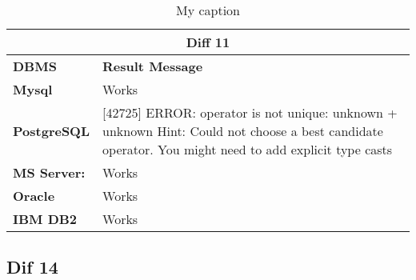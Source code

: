 \begin{table}[h]
\centering
\caption{My caption}
\label{my-label}
\begin{tabular}{|p{2cm}|p{12cm}|}
\hline
\multicolumn{2}{|c|}{\textbf{Diff 11}}                                                                                                                                                                                       \\ \hline
\textbf{DBMS}                              & \textbf{Result Message}                                                                                                                                                         \\ \hline
{\color[HTML]{333333} \textbf{Mysql}}      & {\color[HTML]{333333} Works}                                                                                                                                                    \\ \hline
{\color[HTML]{333333} \textbf{PostgreSQL}} & {\color[HTML]{333333} {[}42725{]} ERROR: operator is not unique: unknown + unknown Hint: Could not choose a best candidate operator. You might need to add explicit type casts} \\ \hline
{\color[HTML]{333333} \textbf{MS Server:}} & {\color[HTML]{333333} Works}                                                                                                                                                    \\ \hline
\textbf{Oracle}                            & Works                                                                                                                                                                           \\ \hline
\textbf{IBM DB2}                           & Works                                                                                                                                                                           \\ \hline
\end{tabular}
\end{table}


\subsection{Dif 14}

